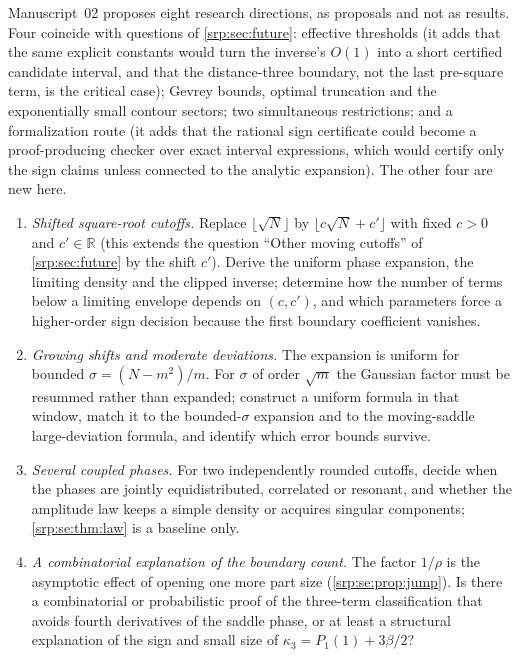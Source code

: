 \documentclass[11pt,a4paper]{article}
\numberwithin{equation}{section}
\theoremstyle{definition}
\theoremstyle{remark}
\newcommand{\R}{\mathbb R}
\begin{document}
Manuscript~02 proposes eight research directions, as proposals and not as
results. Four coincide with questions of \cref{srp:sec:future}: effective
thresholds (it adds that the same explicit constants would turn the
inverse's $O(1)$ into a short certified candidate interval, and that the
distance-three boundary, not the last pre-square term, is the critical
case); Gevrey bounds, optimal truncation and the exponentially small
contour sectors; two simultaneous restrictions; and a formalization route
(it adds that the rational sign certificate could become a proof-producing
checker over exact interval expressions, which would certify only the
sign claims unless connected to the analytic expansion). The other four
are new here.
\begin{enumerate}[leftmargin=2em,itemsep=3pt]
\item \emph{Shifted square-root cutoffs.} Replace $\lfloor\sqrt N\rfloor$ by
$\lfloor c\sqrt N+c'\rfloor$ with fixed $c>0$ and $c'\in\R$ (this extends
the question ``Other moving cutoffs'' of \cref{srp:sec:future} by the shift
$c'$). Derive the uniform phase expansion, the limiting density and the
clipped inverse; determine how the number of terms below a limiting
envelope depends on $(c,c')$, and which parameters force a higher-order
sign decision because the first boundary coefficient vanishes.
\item \emph{Growing shifts and moderate deviations.} The expansion is
uniform for bounded $\sigma=(N-m^2)/m$. For $\sigma$ of order $\sqrt m$ the
Gaussian factor must be resummed rather than expanded; construct a uniform
formula in that window, match it to the bounded-$\sigma$ expansion and to
the moving-saddle large-deviation formula, and identify which error bounds
survive.
\item \emph{Several coupled phases.} For two independently rounded
cutoffs, decide when the phases are jointly equidistributed, correlated or
resonant, and whether the amplitude law keeps a simple density or acquires
singular components; \cref{srp:se:thm:law} is a baseline only.
\item \emph{A combinatorial explanation of the boundary count.} The factor
$1/\rho$ is the asymptotic effect of opening one more part size
(\cref{srp:se:prop:jump}). Is there a combinatorial or probabilistic proof
of the three-term classification that avoids fourth derivatives of the
saddle phase, or at least a structural explanation of the sign and small
size of $\kappa_3=P_1(1)+3\beta/2$?
\end{enumerate}
\end{document}
